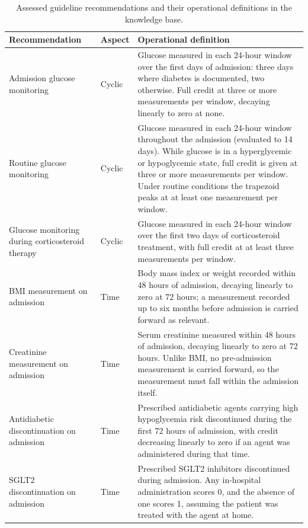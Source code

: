 \begin{table}[t]
\centering
\caption{Assessed guideline recommendations and their operational
definitions in the knowledge base.}
\label{tab:pattern-definitions}
\small
\begin{tabularx}{\textwidth}{
>{\raggedright\arraybackslash}p{}
l
>{\raggedright\arraybackslash}X
}
\toprule
Recommendation & Aspect & Operational definition \\
\midrule

Admission glucose monitoring & Cyclic &
Glucose measured in each 24-hour window over the first days of admission:
three days where diabetes is documented, two otherwise. Full credit at
three or more measurements per window, decaying linearly to zero at
none. \\

Routine glucose monitoring & Cyclic &
Glucose measured in each 24-hour window throughout the admission (evaluated
to 14 days). While glucose is in a hyperglycemic or hypoglycemic state, full
credit is given at three or more measurements per window. Under routine
conditions the trapezoid peaks at at least one measurement per window. \\

Glucose monitoring during corticosteroid therapy & Cyclic &
Glucose measured in each 24-hour window over the first two days of
corticosteroid treatment, with full credit at at least three measurements
per window. \\

BMI measurement on admission & Time &
Body mass index or weight recorded within 48 hours of admission, decaying
linearly to zero at 72 hours; a measurement recorded up to six months
before admission is carried forward as relevant. \\

Creatinine measurement on admission & Time &
Serum creatinine measured within 48 hours of admission, decaying linearly
to zero at 72 hours. Unlike BMI, no pre-admission measurement is carried
forward, so the measurement must fall within the admission itself. \\

Antidiabetic discontinuation on admission & Time &
Prescribed antidiabetic agents carrying high hypoglycemia risk discontinued
during the first 72 hours of admission, with credit decreasing linearly to
zero if an agent was administered during that time. \\

SGLT2 discontinuation on admission & Time &
Prescribed SGLT2 inhibitors discontinued during admission. Any in-hospital
administration scores 0, and the absence of one scores 1, assuming the
patient was treated with the agent at home. \\


\end{tabularx}
\end{table}
